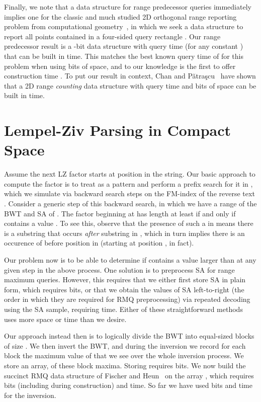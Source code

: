 \documentclass[11pt,runningheads]{llncs}
\begin{document}
{Finally, we note that a data structure for range predecessor queries immediately implies one 
for the classic and much studied 2D orthogonal range reporting problem from computational 
geometry~\cite{chan2011orthogonal},
in which we seek a data structure to report all points contained in a four-sided query rectangle 
. Our range predecessor result is a -bit data structure 
with query time  (for any constant )
that can be built in  time. This matches the best 
known query time of for this problem when using  bits of space, 
and to our knowledge is the first to offer construction time .
To put our result in context, Chan and P{\u a}tra{\c s}cu~\cite{CP2010} have shown that a 
2D range {\em counting} data structure with  query time and  bits of space can be 
built in  time. 

\section{Lempel-Ziv Parsing in Compact Space}
\label{sec-basic}

Assume the next LZ factor starts at position  in the string. Our basic approach 
to compute the factor is to treat  as a pattern and perform a prefix search
for it in , which we simulate via backward search steps on the FM-index of the 
reverse text . Consider a generic step  of this backward search, in which we 
have a range  of the BWT and SA of . The factor beginning at  
has length at least  if and only if  contains a value .
To see this, observe that the presence of such a  in  means
there is a substring  that occurs {\em after} substring 
 in , which in turn implies there is an occurence of 
 before position  in  (starting at position , in fact).

Our problem now is to be able to determine if  contains a value 
larger than  at any given step in the above process. One solution is to preprocess 
SA for range maximum queries. However, this requires that we either first store SA in 
plain form, which requires  bits, or that we obtain the values of SA 
left-to-right  (the order in which they are required for RMQ 
preprocessing) via repeated decoding using the SA sample, requiring  time. 
Either of these straightforward methods uses more space or time than we desire. 

Our approach instead then is to logically divide the BWT into equal-sized blocks 
of size . We then invert the BWT, and during the inversion we record for 
each block the maximum
value of  that we see over the whole inversion process. We store an array,
 of these block maxima. Storing  requires  bits.
We now build the succinct RMQ data structure of Fischer and Heun~\cite{FischerH11} on the
array , which requires  bits (including during construction) and 
time. So far we have used  bits and  time for the inversion.

}
\end{document}
